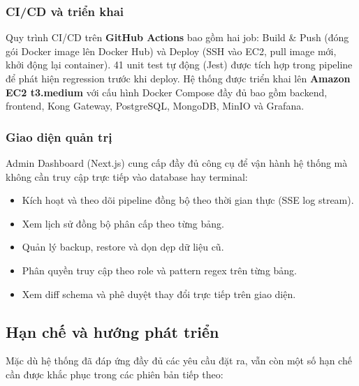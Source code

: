 \subsubsection{CI/CD và triển khai}

Quy trình CI/CD trên \textbf{GitHub Actions} bao gồm hai job: Build \& Push (đóng gói Docker image lên Docker Hub) và Deploy (SSH vào EC2, pull image mới, khởi động lại container). 41 unit test tự động (Jest) được tích hợp trong pipeline để phát hiện regression trước khi deploy. Hệ thống được triển khai lên \textbf{Amazon EC2 t3.medium} với cấu hình Docker Compose đầy đủ bao gồm backend, frontend, Kong Gateway, PostgreSQL, MongoDB, MinIO và Grafana.

\subsubsection{Giao diện quản trị}

Admin Dashboard (Next.js) cung cấp đầy đủ công cụ để vận hành hệ thống mà không cần truy cập trực tiếp vào database hay terminal:
\begin{itemize}
    \item Kích hoạt và theo dõi pipeline đồng bộ theo thời gian thực (SSE log stream).
    \item Xem lịch sử đồng bộ phân cấp theo từng bảng.
    \item Quản lý backup, restore và dọn dẹp dữ liệu cũ.
    \item Phân quyền truy cập theo role và pattern regex trên từng bảng.
    \item Xem diff schema và phê duyệt thay đổi trực tiếp trên giao diện.
\end{itemize}

\subsection{Hạn chế và hướng phát triển}

Mặc dù hệ thống đã đáp ứng đầy đủ các yêu cầu đặt ra, vẫn còn một số hạn chế cần được khắc phục trong các phiên bản tiếp theo:

